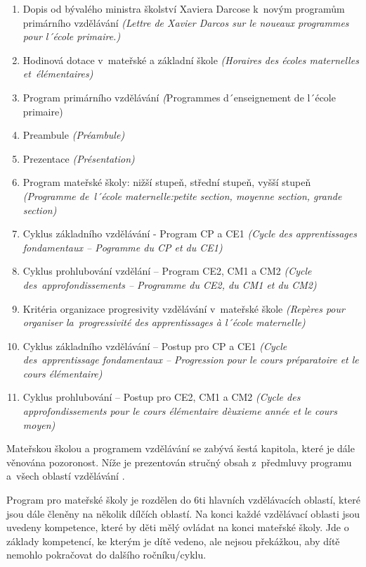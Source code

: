 	\begin{enumerate}[1]
		\setlength\itemsep{-2mm}
		\item Dopis od bývalého ministra školství Xaviera Darcose k novým programům primárního vzdělávání \textit{(Lettre de Xavier Darcos sur le noueaux programmes pour l´école primaire.)}
		\item Hodinová dotace v mateřské a základní škole \textit{(Horaires des écoles maternelles et élémentaires)}
		\item Program primárního vzdělávání \textit({Programmes d´enseignement  de l´école primaire)}
		\item Preambule \textit{(Préambule)}
		\item Prezentace \textit{(Présentation)}
		\item Program mateřské školy: nižší stupeň, střední stupeň, vyšší stupeň \textit{(Programme de l´école maternelle:petite section, moyenne section, grande section)}
		\item Cyklus základního vzdělávání - Program CP a CE1 \textit{(Cycle des apprentissages fondamentaux – Pogramme du CP et du CE1)}
		\item Cyklus prohlubování vzdělání – Program CE2, CM1 a CM2 \textit{(Cycle des approfondissements – Programme du CE2, du CM1 et du CM2)}
		\item Kritéria organizace progresivity vzdělávání v mateřské škole \textit{(Repères pour organiser la progressivité des apprentissages à l´école maternelle)}
		\item Cyklus základního vzdělávání – Postup pro CP a CE1 \textit{(Cycle des apprentissage fondamentaux – Progression pour le cours préparatoire et le cours élémentaire)}
		\item Cyklus prohlubování – Postup pro CE2, CM1 a CM2 \textit{(Cycle des approfondissements pour le cours élémentaire dèuxieme année et le cours moyen)}
	\end{enumerate}


	Mateřskou školou a programem vzdělávání se zabývá šestá kapitola, které je dále věnována pozoronost. Níže je prezentován stručný obsah z předmluvy programu a všech oblastí vzdělávání \citep{program}.

	Program pro mateřské školy je rozdělen do 6ti hlavních vzdělávacích oblastí, které jsou dále členěny na několik dílčích oblastí.
	Na konci každé vzdělávací oblasti jsou uvedeny kompetence, které by děti mělý ovládat na konci mateřské školy. Jde o základy kompetencí, ke kterým je dítě vedeno, ale nejsou překážkou, aby dítě nemohlo pokračovat do dalšího ročníku/cyklu.



